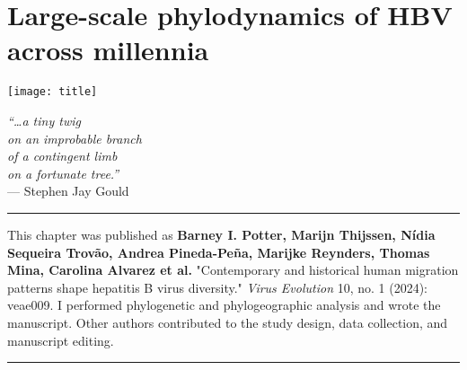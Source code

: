\chapter{Large-scale phylodynamics of HBV across millennia}\label{ch:chapter3}

\begin{minipage}[b]{0.6\textwidth}
    \texttt{[image: title]} %
  \end{minipage}
  \hfill
  \begin{minipage}[b]{0.35\textwidth}
    \footnotesize
    \begin{flushright}
      \textit{``\ldots a tiny twig\\on an improbable branch\\of a contingent limb\\on a fortunate tree.''} \\
      --- Stephen Jay Gould
    \end{flushright}
    \vspace{2cm}
  \end{minipage}

\clearpage

\hrule
\vspace*{12pt}
This chapter was published as \textbf{Barney I. Potter, Marijn Thijssen, Nídia Sequeira Trovão, Andrea Pineda-Peña, Marijke Reynders, Thomas Mina, Carolina Alvarez et al.} "Contemporary and historical human migration patterns shape hepatitis B virus diversity." \textit{Virus Evolution} 10, no. 1 (2024): veae009.
I performed phylogenetic and phylogeographic analysis and wrote the manuscript.
Other authors contributed to the study design, data collection, and manuscript editing.
\vspace*{12pt}
\hrule

\onehalfspacing


